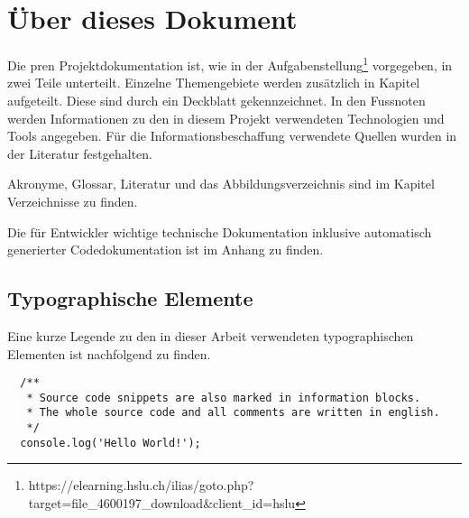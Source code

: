   \section*{Über dieses Dokument}

  Die \acrshort{pren} Projektdokumentation ist, wie in der Aufgabenstellung\footnote{
    https://elearning.hslu.ch/ilias/goto.php?target=file_4600197_download&client_id=hslu
  } vorgegeben, in zwei Teile unterteilt.
  Einzelne Themengebiete werden zusätzlich in Kapitel aufgeteilt. Diese sind durch
  ein Deckblatt gekennzeichnet.
  In den Fussnoten werden Informationen zu den in diesem Projekt verwendeten
  Technologien und Tools angegeben.
  Für die Informationsbeschaffung verwendete Quellen wurden in der Literatur
  festgehalten.

  Akronyme, Glossar, Literatur und das Abbildungsverzeichnis sind im
  Kapitel Verzeichnisse zu finden.

  Die für Entwickler wichtige technische Dokumentation inklusive
  automatisch generierter Codedokumentation ist im Anhang
  zu finden.

  \subsection*{Typographische Elemente}

  Eine kurze Legende zu den in dieser Arbeit verwendeten typographischen Elementen
  ist nachfolgend zu finden.


  \begin{verbatim}
  /**
   * Source code snippets are also marked in information blocks.
   * The whole source code and all comments are written in english.
   */
  console.log('Hello World!');
  \end{verbatim}